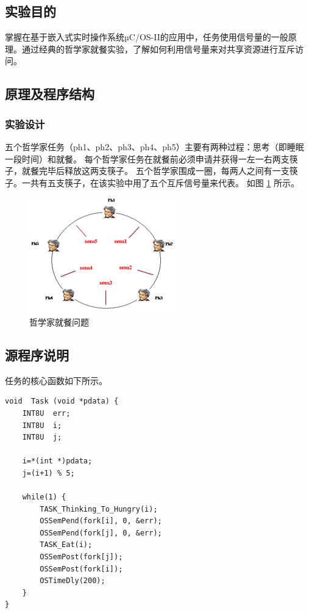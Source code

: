 \documentclass{ctexart}
\begin{document}
    \subsection{实验目的}
    
    掌握在基于嵌入式实时操作系统µC/OS-II的应用中，任务使用信号量的一般原理。通过经典的哲学家就餐实验，了解如何利用信号量来对共享资源进行互斥访问。
    
    \subsection{原理及程序结构}
    
    \subsubsection{实验设计}
    
    五个哲学家任务（ph1、ph2、ph3、ph4、ph5）主要有两种过程：思考（即睡眠一段时间）和就餐。
    每个哲学家任务在就餐前必须申请并获得一左一右两支筷子，就餐完毕后释放这两支筷子。
    五个哲学家围成一圈，每两人之间有一支筷子。一共有五支筷子，在该实验中用了五个互斥信号量来代表。
    如图 \ref{fig:pe-1} 所示。
    \begin{figure}
     \centering
     \includegraphics[width=0.7\linewidth]{pe-1}
     \caption{哲学家就餐问题}
     \label{fig:pe-1}
    \end{figure}

    \subsection{源程序说明}
    
    任务的核心函数如下所示。
    \begin{lstlisting}
void  Task (void *pdata) {
    INT8U  err;
    INT8U  i;
    INT8U  j;
    
    i=*(int *)pdata;
    j=(i+1) % 5;
    
    while(1) {
        TASK_Thinking_To_Hungry(i);
        OSSemPend(fork[i], 0, &err);
        OSSemPend(fork[j], 0, &err);
        TASK_Eat(i);
        OSSemPost(fork[j]);
        OSSemPost(fork[i]);
        OSTimeDly(200);
    }
}
    \end{lstlisting}
    
\end{document}
